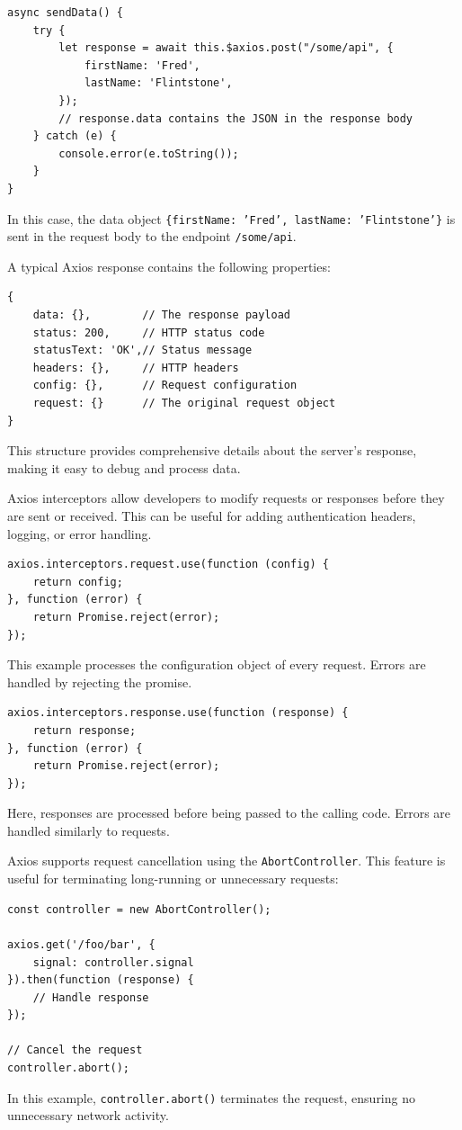 \begin{verbatim}
async sendData() {
    try {
        let response = await this.$axios.post("/some/api", {
            firstName: 'Fred',
            lastName: 'Flintstone',
        });
        // response.data contains the JSON in the response body
    } catch (e) {
        console.error(e.toString());
    }
}
\end{verbatim}
In this case, the data object \texttt{\{firstName: 'Fred', lastName: 'Flintstone'\}} is sent in the request body to the endpoint \texttt{/some/api}.

A typical Axios response contains the following properties:
\begin{verbatim}
{
    data: {},        // The response payload
    status: 200,     // HTTP status code
    statusText: 'OK',// Status message
    headers: {},     // HTTP headers
    config: {},      // Request configuration
    request: {}      // The original request object
}
\end{verbatim}
This structure provides comprehensive details about the server's response, making it easy to debug and process data.

Axios interceptors allow developers to modify requests or responses before they are sent or received. This can be useful for adding authentication headers, logging, or error handling.

\begin{verbatim}
axios.interceptors.request.use(function (config) {
    return config;
}, function (error) {
    return Promise.reject(error);
});
\end{verbatim}
This example processes the configuration object of every request. Errors are handled by rejecting the promise.

\begin{verbatim}
axios.interceptors.response.use(function (response) {
    return response;
}, function (error) {
    return Promise.reject(error);
});
\end{verbatim}
Here, responses are processed before being passed to the calling code. Errors are handled similarly to requests.

Axios supports request cancellation using the \texttt{AbortController}. This feature is useful for terminating long-running or unnecessary requests:

\begin{verbatim}
const controller = new AbortController();

axios.get('/foo/bar', {
    signal: controller.signal
}).then(function (response) {
    // Handle response
});

// Cancel the request
controller.abort();
\end{verbatim}
In this example, \texttt{controller.abort()} terminates the request, ensuring no unnecessary network activity.

